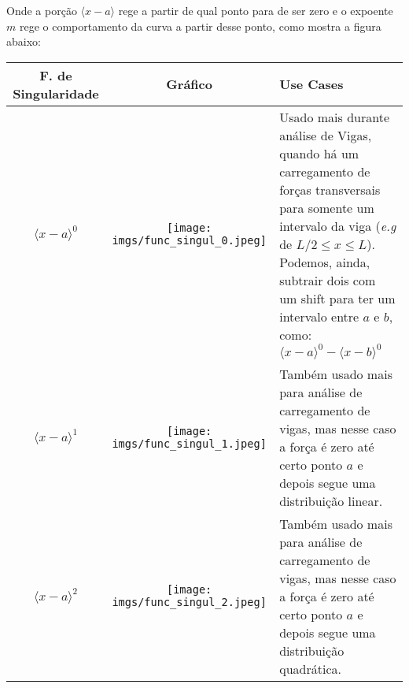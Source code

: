 \documentclass{article}
\begin{document}
            Onde a porção $\langle x - a \rangle$ rege a partir de qual ponto para de ser zero e o expoente $m$ rege o comportamento da curva a partir desse ponto, como mostra a figura abaixo:

            \begin{table}[h]
                \centering
                \begin{tabular}{|c|c|l|} \hline
                    \textbf{F. de Singularidade} & \textbf{Gráfico} & \textbf{Use Cases} \\ \hline
                    $\langle x - a\rangle^0$ & 
                        \begin{minipage}{.3\textwidth}
                            \centering
                            \texttt{[image: imgs/func\_singul\_0.jpeg]}
                        \end{minipage}&
                        \begin{minipage}{.4\textwidth}
                            Usado mais durante análise de Vigas, quando há um carregamento de forças transversais para somente um intervalo da viga (\emph{e.g} de $L/2 \le x \le L$). Podemos,
                            ainda, subtrair dois com um shift para ter um intervalo entre $a$ e $b$, como: $\langle x - a\rangle^0 - \langle x - b\rangle^0$ 
                        \end{minipage}  \\ \hline

                    $\langle x - a\rangle^1$ & 
                        \begin{minipage}{.3\textwidth}
                            \centering
                            \texttt{[image: imgs/func\_singul\_1.jpeg]}
                        \end{minipage}&
                        \begin{minipage}{.4\textwidth}
                            Também usado mais para análise de carregamento de vigas, mas nesse caso a força é zero até certo ponto $a$ e depois segue uma distribuição linear.
                        \end{minipage}  \\ \hline

                    $\langle x - a\rangle^2$ & 
                        \begin{minipage}{.3\textwidth}
                            \centering
                            \texttt{[image: imgs/func\_singul\_2.jpeg]}
                        \end{minipage}&
                        \begin{minipage}{.4\textwidth}
                            Também usado mais para análise de carregamento de vigas, mas nesse caso a força é zero até certo ponto $a$ e depois segue uma distribuição quadrática.
                        \end{minipage}  \\ \hline
                    

\end{tabular}
\end{table}
\end{document}
